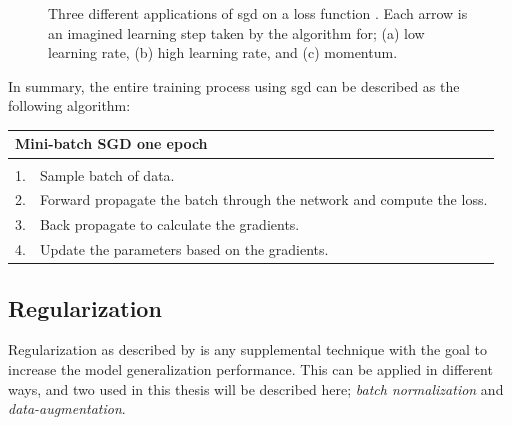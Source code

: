     \begin{figure}[H]
        \centering

        
        \caption[Learning rates]{Three different applications of \gls{sgd} on a loss function . Each arrow is an imagined learning step taken by the algorithm for; (a) low learning rate, (b) high learning rate, and (c) momentum.}
      	\medskip 
        \label{learning_rates}
    \end{figure}

    In summary, the entire training process using \gls{sgd} can be described as the following algorithm\cite{farsal2018deep}:
    
    \begin{longtable}{lllllll} \label{sgd algorithm}\\
    \hline
    \multicolumn{7}{l}{Mini-batch SGD one epoch}                                                              \\ \hline
    \endfirsthead
    \endhead
    \hline
    \endfoot
    \endlastfoot
    \multicolumn{7}{l}{Loop:}                                                                       \\
    1.   & \multicolumn{6}{l}{Sample batch of data.}                                                \\
    2.   & \multicolumn{6}{l}{Forward propagate the batch through the network and compute the loss.} \\
    3.   & \multicolumn{6}{l}{Back propagate to calculate the gradients.}                            \\
    4.   & \multicolumn{6}{l}{Update the parameters based on the gradients.}                         \\ \hline
    \end{longtable}
    
    

    
\subsection{Regularization}
    Regularization as described by \citeauthor{kukavcka2017_regularization}\cite{kukavcka2017_regularization} is any supplemental technique with the goal to increase the model generalization performance. This can be applied in different ways, and two used in this thesis will be described here; \textit{batch normalization} and \textit{data-augmentation}.
    
